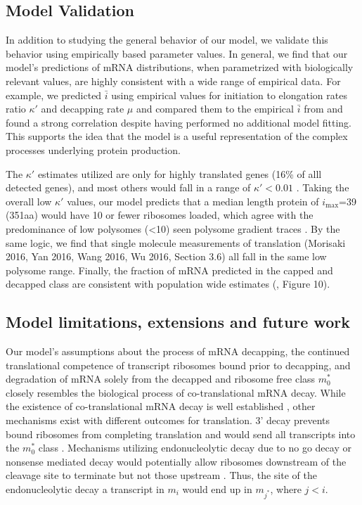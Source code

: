 \documentclass[a4,center,fleqn,nocrop]{NAR}
\newcommand{\imax}{\ensuremath{{i_{\max}}}\xspace}
\newcommand{\MRL}{\ensuremath{\bar{i}}\xspace}
\begin{document}
\subsection{Model Validation}

In addition to studying the general behavior of our model, we validate this behavior using empirically based parameter values.
In general, we find that our model's predictions of mRNA distributions, when parametrized with biologically relevant values, are highly consistent with a wide range of empirical data.
For example, we predicted \MRL using empirical values for initiation to elongation rates ratio $\kappa'$ \citep{RN13} and decapping rate $\mu$ \citep{RN27} and compared them to the empirical \MRL from \citep{RN29} and found a strong correlation despite having performed no additional model fitting. This supports the idea that the model is a useful representation of the complex processes underlying protein production.

The $\kappa'$ estimates utilized are only for highly translated genes (16\% of alll detected genes), and most others would fall in a range of $\kappa'<0.01$ \citep{RN13}.
Taking the overall low $\kappa'$ values, our model predicts that a median length protein of \imax =39 (351aa) would have 10 or fewer ribosomes loaded, which agree with the predominance of low polysomes (<10) seen polysome gradient traces \citep{RN35, RN36}. 
By the same logic, we find that single molecule measurements of translation \citep{RN30,RN32,RN33,RN31} (Morisaki 2016, Yan 2016, Wang 2016, Wu 2016, Section 3.6) all fall in the same low polysome range.
Finally, the fraction of mRNA predicted in the capped and decapped class  are consistent with population wide estimates (\citep{RN4}, Figure 10). 


\subsection{Model limitations, extensions and future work}

Our model's assumptions about the process of mRNA decapping, the continued translational competence of transcript ribosomes bound prior to decapping, and degradation of mRNA solely from the decapped and ribosome free class $m_0^*$  closely resembles the biological process of co-translational mRNA decay. While the existence of co-translational mRNA decay is well established \citep{RN4,RN28}, other mechanisms exist with different outcomes for translation. 3' decay prevents bound ribosomes from completing translation and would send all transcripts into the $m_0^*$ class . Mechanisms utilizing endonucleolytic decay due to no go decay or nonsense mediated decay would potentially allow ribosomes downstream of the cleavage site to terminate but not those upstream \citep{RN38,RN2}. Thus,  the site of the endonucleolytic decay a transcript in $m_i$ would end up in $m_{j^*}$, where $j < i$.
\end{document}
